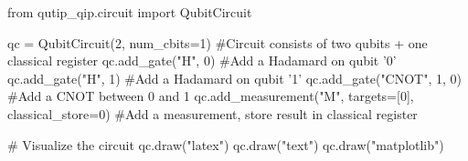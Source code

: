 from qutip_qip.circuit import QubitCircuit

qc = QubitCircuit(2, num_cbits=1) #Circuit consists of two qubits + one classical register
qc.add_gate("H", 0) #Add a Hadamard on qubit '0'
qc.add_gate("H", 1) #Add a Hadamard on qubit '1'
qc.add_gate("CNOT", 1, 0) #Add a CNOT between 0 and 1
qc.add_measurement("M", targets=[0], classical_store=0) #Add a measurement, store result in classical register

# Visualize the circuit
qc.draw("latex")
qc.draw("text")
qc.draw("matplotlib")